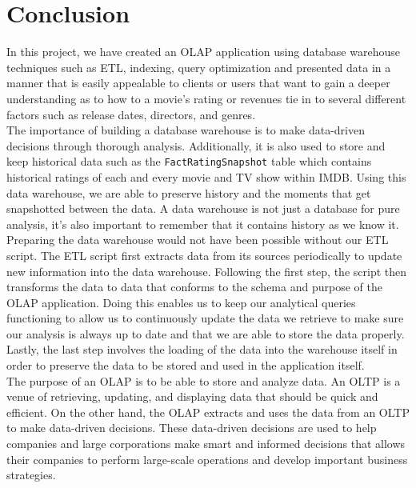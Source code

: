 \section{Conclusion}

In this project, we have created an OLAP application using database warehouse techniques such as ETL, indexing, query optimization and presented data in a manner that is easily
appealable to clients or users that want to gain a deeper understanding as to how to a movie's rating or revenues tie in to several different factors such as release dates, directors, 
and genres. \\

The importance of building a database warehouse is to make data-driven decisions through thorough analysis. Additionally, it is also used to store and keep historical data such as the
\texttt{FactRatingSnapshot} table which contains historical ratings of each and every movie and TV show within IMDB. Using this data warehouse, we are able to preserve history and
the moments that get snapshotted between the data. A data warehouse is not just a database for pure analysis, it's also important to remember that it contains history as we know it. \\

Preparing the data warehouse would not have been possible without our ETL script. The ETL script first extracts data from its sources periodically to update new information into the data
warehouse. Following the first step, the script then transforms the data to data that conforms to the schema and purpose of the OLAP application. Doing this enables us to keep our
analytical queries functioning to allow us to continuously update the data we retrieve to make sure our analysis is always up to date and that we are able to store the data properly.
Lastly, the last step involves the loading of the data into the warehouse itself in order to preserve the data to be stored and used in the application itself. \\

The purpose of an OLAP is to be able to store and analyze data. An OLTP is a venue of retrieving, updating, and displaying data that should be quick and efficient. On the other hand, the
OLAP extracts and uses the data from an OLTP to make data-driven decisions. These data-driven decisions are used to help companies and large corporations make smart and informed decisions
that allows their companies to perform large-scale operations and develop important business strategies. \\

